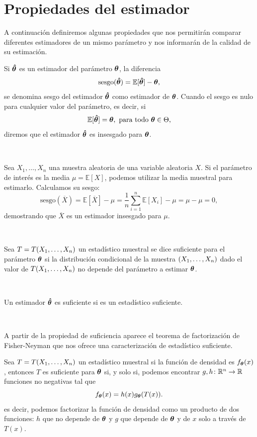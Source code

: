 \documentclass[oneside,openright,titlepage,numbers=noenddot,openany,headinclude,footinclude=true,
cleardoublepage=empty,abstractoff,BCOR=5mm,paper=a4,fontsize=12pt,main=spanish]{scrreprt}
\begin{document}
\section{Propiedades del estimador}

A continuación definiremos algunas propiedades que nos permitirán comparar diferentes estimadores de un mismo parámetro y nos informarán de la calidad de su estimación.\\

\begin{definition}
Si $\bm{\hat{\theta}}$ es un estimador del parámetro $\bm{\theta}$, la diferencia $$\text{sesgo}(\bm{\hat{\theta}})=\mathbb{E}[\bm{\hat{\theta}}]-\bm{\theta},$$
se denomina sesgo del estimador $\bm{\hat{\theta}}$ como estimador de $\bm{\theta}$. Cuando el sesgo es nulo para cualquier valor del parámetro, es decir, si $$\mathbb{E}[\htheta]=\btheta, \ \text{para todo} \ \btheta \in \Theta,$$
diremos que el estimador $\bm{\hat{\theta}}$ es insesgado para $\bm{\theta}$.
\end{definition}\

\begin{example} \label{ex:sesgonul}
Sea $X_1,\dots,X_n$ una muestra aleatoria de una variable aleatoria $X$. Si el parámetro de interés es la media $\mu=\mathbb{E}[X]$, podemos utilizar la media muestral para estimarlo. Calculamos su sesgo: $$\text{sesgo}(\overline{X})=\mathbb{E}[\overline{X}]-\mu=\frac{1}{n}\sum_{i=1}^n \mathbb{E}[X_i]-\mu=\mu-\mu=0,$$
demostrando que $\overline{X}$ es un estimador insesgado para $\mu$.
\end{example}\

\begin{definition}
Sea $T=T(X_1,\dots,X_n)$ un estadístico muestral se dice suficiente para el parámetro $\bm{\theta}$ si la distribución condicional de la muestra $(X_1,\dots,X_n)$ dado el valor de $T(X_1,\dots,X_n)$ no depende del parámetro a estimar $\bm{\theta}$.
\end{definition}\


\begin{definition}[Suficiencia]
Un estimador $\bm{\hat{\theta}}$ es suficiente si es un estadístico suficiente.
\end{definition}\

A partir de la propiedad de suficiencia aparece el teorema de factorización de Fisher-Neyman que nos ofrece una caracterización de estadístico suficiente.\\


\begin{theorem}
Sea $T=T(X_1,\dots,X_n)$ un estadístico muestral si la función de densidad es $f_{\bm{\theta}}(x)$, entonces $T$ es suficiente para $\bm{\theta}$ si, y solo si, podemos encontrar $g,h\colon \mathbb{R}^n \to \mathbb{R}$ funciones no negativas tal que $$f_{\bm{\theta}}(x)=h(x)g_{\bm{\theta}}(T(x)).$$
es decir, podemos factorizar la función de densidad como un producto de dos funciones: $h$ que no depende de $\bm{\theta}$ y $g$ que depende de $\bm{\theta}$ y de $x$ solo a través de $T(x)$.
\end{theorem}\
\end{document}
